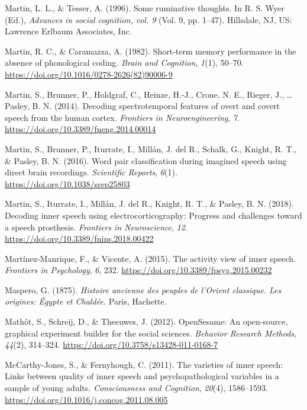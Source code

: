 \documentclass[a4paper,12pt,twoside,onecolumn,openright,final,oldfontcommands]{memoir}
\begin{document}
\leavevmode\hypertarget{ref-Martin}{}%
Martin, L. L., \& Tesser, A. (1996). Some ruminative thoughts. In R. S. Wyer (Ed.), \emph{Advances in social cognition, vol. 9} (Vol. 9, pp. 1--47). Hillsdale, NJ, US: Lawrence Erlbaum Associates, Inc.

\leavevmode\hypertarget{ref-martin_short-term_1982}{}%
Martin, R. C., \& Caramazza, A. (1982). Short-term memory performance in the absence of phonological coding. \emph{Brain and Cognition}, \emph{1}(1), 50--70. \url{https://doi.org/10.1016/0278-2626(82)90006-9}

\leavevmode\hypertarget{ref-martin_decoding_2014}{}%
Martin, S., Brunner, P., Holdgraf, C., Heinze, H.-J., Crone, N. E., Rieger, J., \ldots{} Pasley, B. N. (2014). Decoding spectrotemporal features of overt and covert speech from the human cortex. \emph{Frontiers in Neuroengineering}, \emph{7}. \url{https://doi.org/10.3389/fneng.2014.00014}

\leavevmode\hypertarget{ref-martin_word_2016}{}%
Martin, S., Brunner, P., Iturrate, I., Millán, J. del R., Schalk, G., Knight, R. T., \& Pasley, B. N. (2016). Word pair classification during imagined speech using direct brain recordings. \emph{Scientific Reports}, \emph{6}(1). \url{https://doi.org/10.1038/srep25803}

\leavevmode\hypertarget{ref-martin_decoding_2018}{}%
Martin, S., Iturrate, I., Millán, J. del R., Knight, R. T., \& Pasley, B. N. (2018). Decoding inner speech using electrocorticography: Progress and challenges toward a speech prosthesis. \emph{Frontiers in Neuroscience}, \emph{12}. \url{https://doi.org/10.3389/fnins.2018.00422}

\leavevmode\hypertarget{ref-Martinez-Manrique2015}{}%
Martínez-Manrique, F., \& Vicente, A. (2015). The activity view of inner speech. \emph{Frontiers in Psychology}, \emph{6}, 232. \url{https://doi.org/10.3389/fpsyg.2015.00232}

\leavevmode\hypertarget{ref-maspero_histoire_1875}{}%
Maspero, G. (1875). \emph{Histoire ancienne des peuples de l'Orient classique. Les origines: Égypte et Chaldée.} Paris, Hachette.

\leavevmode\hypertarget{ref-mathot_opensesame_2012}{}%
Mathôt, S., Schreij, D., \& Theeuwes, J. (2012). OpenSesame: An open-source, graphical experiment builder for the social sciences. \emph{Behavior Research Methods}, \emph{44}(2), 314--324. \url{https://doi.org/10.3758/s13428-011-0168-7}

\leavevmode\hypertarget{ref-McCarthy-Jones2011}{}%
McCarthy-Jones, S., \& Fernyhough, C. (2011). The varieties of inner speech: Links between quality of inner speech and psychopathological variables in a sample of young adults. \emph{Consciousness and Cognition}, \emph{20}(4), 1586--1593. \url{https://doi.org/10.1016/j.concog.2011.08.005}
\end{document}
